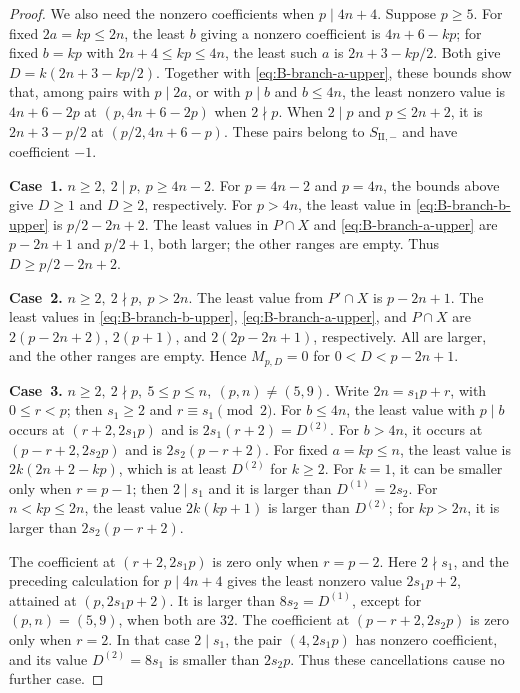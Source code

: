 \documentclass[11pt,a4paper]{amsart}
\theoremstyle{plain}
\numberwithin{equation}{section}
\newenvironment{pf}{\begin{proof}}{\end{proof}}
\begin{document}
\begin{pf}
	We also need the nonzero coefficients when \(p\mid4n+4\).
	Suppose \(p\ge5\). For fixed \(2a=kp\le2n\), the least
	\(b\) giving a nonzero coefficient is \(4n+6-kp\); for fixed
	\(b=kp\) with \(2n+4\le kp\le4n\), the least such \(a\) is
	\(2n+3-kp/2\). Both give \(D=k(2n+3-kp/2)\).
	Together with \eqref{eq:B-branch-a-upper}, these bounds show that,
	among pairs with \(p\mid2a\), or with \(p\mid b\) and \(b\le4n\),
	the least nonzero value is \(4n+6-2p\) at
	\((p,4n+6-2p)\) when \(2\nmid p\). When \(2\mid p\) and
	\(p\le2n+2\), it is \(2n+3-p/2\) at
	\((p/2,4n+6-p)\). These pairs belong to \(S_{\mathrm{II},-}\)
	and have coefficient \(-1\).
	
	\smallskip
	
	\noindent\textbf{Case~1.} \(n\ge2,\ 2\mid p,\ p\ge4n-2\).
	For \(p=4n-2\) and \(p=4n\), the bounds above give \(D\ge1\)
	and \(D\ge2\), respectively. For \(p>4n\), the least value in
	\eqref{eq:B-branch-b-upper} is \(p/2-2n+2\). The least values
	in \(P\cap X\) and \eqref{eq:B-branch-a-upper} are
	\(p-2n+1\) and \(p/2+1\), both larger; the other ranges are empty.
	Thus \(D\ge p/2-2n+2\).
	
	\smallskip
	
	\noindent\textbf{Case~2.} \(n\ge2,\ 2\nmid p,\ p>2n\).
	The least value from \(P'\cap X\) is \(p-2n+1\).
	The least values in \eqref{eq:B-branch-b-upper},
	\eqref{eq:B-branch-a-upper}, and \(P\cap X\) are
	\(2(p-2n+2)\), \(2(p+1)\), and \(2(2p-2n+1)\), respectively.
	All are larger, and the other ranges are empty. Hence
	\(M_{p,D}=0\) for \(0<D<p-2n+1\).
	
	\smallskip
	
	\noindent\textbf{Case~3.} \(n\ge2,\ 2\nmid p,\ 5\le p\le n,\ (p,n)\ne(5,9)\).
	Write \(2n=s_1p+r\), with \(0\le r<p\); then \(s_1\ge2\)
	and \(r\equiv s_1\pmod2\).
	For \(b\le4n\), the least value with \(p\mid b\) occurs at
	\((r+2,2s_1p)\) and is \(2s_1(r+2)=D^{(2)}\).
	For \(b>4n\), it occurs at \((p-r+2,2s_2p)\) and is
	\(2s_2(p-r+2)\).
	For fixed \(a=kp\le n\), the least value is
	\(2k(2n+2-kp)\), which is at least \(D^{(2)}\) for \(k\ge2\).
	For \(k=1\), it can be smaller only when \(r=p-1\); then
	\(2\mid s_1\) and it is larger than \(D^{(1)}=2s_2\).
	For \(n<kp\le2n\), the least value \(2k(kp+1)\) is larger
	than \(D^{(2)}\); for \(kp>2n\), it is larger than
	\(2s_2(p-r+2)\).
	
	The coefficient at \((r+2,2s_1p)\) is zero only when \(r=p-2\).
	Here \(2\nmid s_1\), and the preceding calculation for
	\(p\mid4n+4\) gives the least nonzero value
	\(2s_1p+2\), attained at \((p,2s_1p+2)\).
	It is larger than \(8s_2=D^{(1)}\), except for
	\((p,n)=(5,9)\), when both are \(32\).
	The coefficient at \((p-r+2,2s_2p)\) is zero only when \(r=2\).
	In that case \(2\mid s_1\), the pair \((4,2s_1p)\) has
	nonzero coefficient, and its value \(D^{(2)}=8s_1\) is smaller
	than \(2s_2p\). Thus these cancellations cause no further case.
	

\end{pf}
\end{document}
